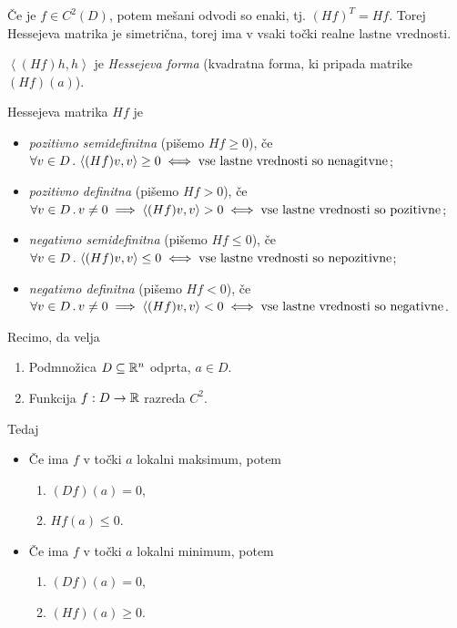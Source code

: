 \begin{opomba}
    Če je $f \in C^2(D)$, potem mešani odvodi so enaki, tj. $(Hf)^T = Hf$. Torej Hessejeva matrika je simetrična, torej ima v vsaki točki realne lastne vrednosti. 
\end{opomba}

$\left\langle (Hf)h, h\right\rangle$ je \emph{Hessejeva forma} (kvadratna forma, ki pripada matrike $(Hf)(a)$).

\begin{definicija}
    Hessejeva matrika $Hf$ je
    \begin{itemize}
        \item \emph{pozitivno semidefinitna} (pišemo $Hf \geq 0$), če $\forall v \in D \,.\, \left\langle (Hf)v, v\right\rangle \geq 0 \iff \text{vse lastne vrednosti so nenagitvne}$;
        \item \emph{pozitivno definitna} (pišemo $Hf > 0$), če $\forall v \in D \,.\, v \neq 0 \implies \left\langle (Hf)v, v\right\rangle > 0 \iff \text{vse lastne vrednosti so pozitivne}$;
        \item \emph{negativno semidefinitna} (pišemo $Hf \leq 0$), če $\forall v \in D \,.\,\left\langle (Hf)v, v\right\rangle \leq 0 \iff \text{vse lastne vrednosti so nepozitivne}$;
        \item \emph{negativno definitna} (pišemo $Hf < 0$), če $\forall v \in D \,.\, v \neq 0 \implies \left\langle (Hf)v, v\right\rangle < 0 \iff \text{vse lastne vrednosti so negativne}$.
    \end{itemize}
\end{definicija}

\begin{trditev}
    Recimo, da velja
    \begin{enumerate}
        \item Podmnožica $D \subseteq \mathbb{R}^n$ odprta, $a \in D$.
        \item Funkcija $f: D \to \mathbb{R}$ razreda $C^2$.
    \end{enumerate}
    Tedaj
    \begin{itemize}
        \item Če ima $f$ v točki $a$ lokalni maksimum, potem
        \begin{enumerate}
            \item $(Df)(a) = 0$,
            \item $Hf(a) \leq 0$.
        \end{enumerate}
        \item Če ima $f$ v točki $a$ lokalni minimum, potem
        \begin{enumerate}
            \item $(Df)(a) = 0$,
            \item $(Hf)(a) \geq 0$.
        \end{enumerate}
    \end{itemize}
\end{trditev}

